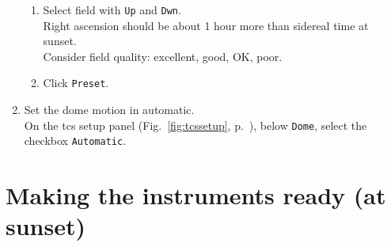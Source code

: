 \documentclass[11pt,fleqn]{book}
\def\figref#1{Fig.~\ref{fig:#1}, p.~\pageref{fig:#1}}
\begin{document}
\begin{enumerate}
\begin{enumerate}
            \item Select field with \texttt{Up} and \texttt{Dwn}.\\
                  Right ascension should be about 1 hour more than sidereal time at sunset.\\
                  Consider field quality: excellent, good, OK, poor.
            \item Click \texttt{Preset}.
            \end{enumerate}      
         \item Set the dome motion in automatic.\label{list:domeauto}\\
               On the \gls{tcs} setup panel (\figref{tcssetup}), below \texttt{Dome}, select the checkbox \texttt{Automatic}.
\end{enumerate}


\section{Making the instruments ready (at sunset)}
\label{sec:insprep}
\end{document}
